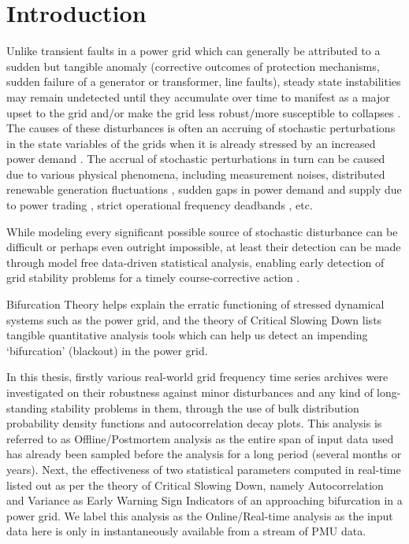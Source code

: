 \section[Introduction]{Introduction}
\label{sec:intro}

Unlike transient faults in a power grid which can generally be attributed to a sudden but tangible anomaly (corrective outcomes of protection mechanisms, sudden failure of a generator or transformer, line faults), steady state instabilities may remain undetected until they accumulate over time to manifest as a major upset to the grid \cite{entsoeReportGridCollapseContinentalEurope2021Jan} and/or make the grid less robust/more susceptible to collapses \cite{schafer01}. The causes of these disturbances is often an accruing of stochastic perturbations in the state variables of the grids when it is already stressed by an increased power demand \cite{rosehartBifurcationAnalysisOfVariousPowerSystemModels}.  The accrual of stochastic perturbations in turn can be caused due to various physical phenomena, including measurement noises, distributed renewable generation fluctuations \cite{adeen01}, sudden gaps in power demand and supply due to power trading \cite{schafer01}, strict operational frequency deadbands \cite{vorobev01, francesca01}, etc.
 
While modeling every significant possible source of stochastic disturbance can be difficult or perhaps even outright impossible, at least their detection can be made through model free data-driven statistical analysis, enabling early detection of grid stability problems for a timely course-corrective action \cite{schafer01, sanchez01, ghanvati01}.

Bifurcation Theory \cite{nathanKutzNotesOnBifurcationTheoryAndNormalForms, rosehartBifurcationAnalysisOfVariousPowerSystemModels, chenBifurcationsAndChaosInEngineering, mohlerDyanmicsAndControlPartOne} helps explain the erratic functioning of stressed dynamical systems such as the power grid, and the theory of Critical Slowing Down \cite{schefferEarlyWarningSignalsForCriticalTransitions} lists tangible quantitative analysis tools which can help us detect an impending `bifurcation' (blackout) in the power grid.

In this thesis, firstly various real-world grid frequency time series archives were investigated on their robustness against minor disturbances and any kind of long-standing stability problems in them, through the use of bulk distribution probability density functions and autocorrelation decay plots. This analysis is referred to as Offline/Postmortem analysis as the entire span of input data used has already been sampled before the analysis for a long period (several months or years). Next,  the effectiveness of two statistical parameters computed in real-time listed out as per the theory of Critical Slowing Down, namely Autocorrelation and Variance as Early Warning Sign Indicators of an approaching bifurcation in a power grid. We label this analysis as the Online/Real-time analysis as the input data here is only in instantaneously available from a stream of PMU data.
